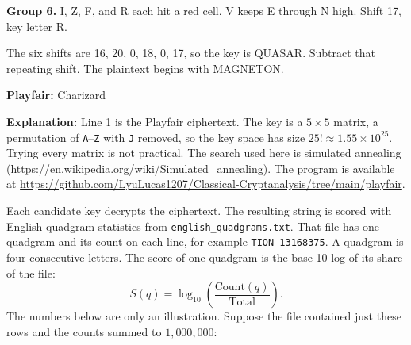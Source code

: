 \documentclass[12pt]{article}
\begin{document}
\begin{answer}
    \textbf{Group 6.} I, Z, F, and R each hit a red cell. V keeps E through N high. Shift 17, key letter R.

    \begin{center}
    \end{center}

    The six shifts are 16, 20, 0, 18, 0, 17, so the key is QUASAR. Subtract that repeating shift. The plaintext begins with MAGNETON.

    \smallskip
    {\scriptsize\ttfamily{}}

    \bigskip
    \textbf{Playfair:} Charizard

    \textbf{Explanation:}
    Line 1 is the Playfair ciphertext. The key is a \(5\times 5\) matrix, a permutation of \texttt{A}--\texttt{Z} with \texttt{J} removed, so the key space has size \(25!\approx 1.55\times 10^{25}\). Trying every matrix is not practical. The search used here is simulated annealing (\mbox{\url{https://en.wikipedia.org/wiki/Simulated_annealing}}). The program is available at \href{https://github.com/LyuLucas1207/Classical-Cryptanalysis/tree/main/playfair}{https://github.com/LyuLucas1207/\allowbreak{}Classical-Cryptanalysis/tree/main/playfair}.

    Each candidate key decrypts the ciphertext. The resulting string is scored with English quadgram statistics from \texttt{english\_quadgrams.txt}. That file has one quadgram and its count on each line, for example \texttt{TION 13168375}. A quadgram is four consecutive letters. The score of one quadgram is the base-10 log of its share of the file:
    \[
    S(q)=\log_{10}\!\left(\frac{\mathrm{Count}(q)}{\mathrm{Total}}\right).
    \]
    The numbers below are only an illustration. Suppose the file contained just these rows and the counts summed to \(1{,}000{,}000\):


\end{answer}
\end{document}
